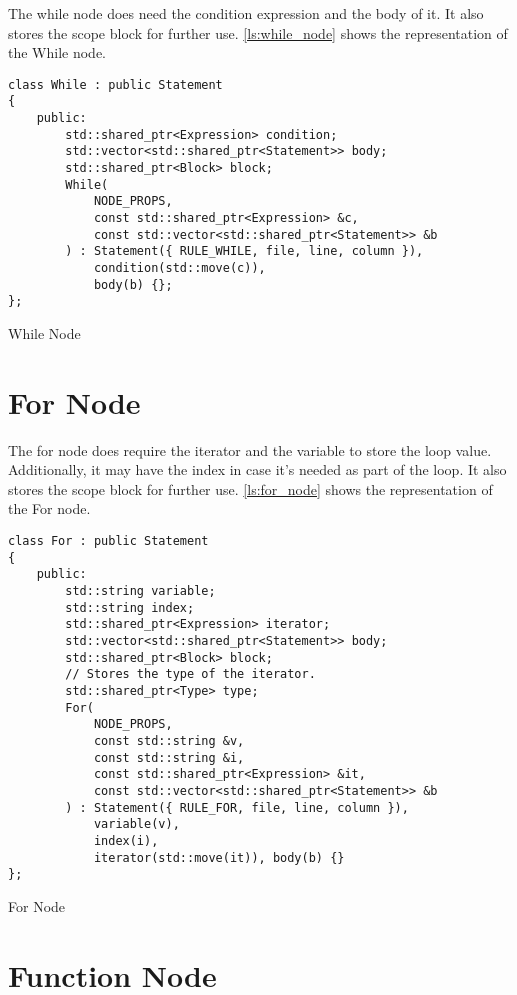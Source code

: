 The while node does need the condition expression and the body of it.
It also stores the scope block for further use.
\autoref{ls:while_node} shows the representation of the While node.

\begin{listing}[H]
\begin{verbatim}
class While : public Statement
{
    public:
        std::shared_ptr<Expression> condition;
        std::vector<std::shared_ptr<Statement>> body;
        std::shared_ptr<Block> block;
        While(
            NODE_PROPS,
            const std::shared_ptr<Expression> &c,
            const std::vector<std::shared_ptr<Statement>> &b
        ) : Statement({ RULE_WHILE, file, line, column }),
            condition(std::move(c)),
            body(b) {};
};
\end{verbatim}
\caption{While Node}
\label{ls:while_node}
\end{listing}

\section{For Node}

The for node does require the iterator and the variable to store the loop value.
Additionally, it may have the index in case it's needed as part of the loop.
It also stores the scope block for further use.
\autoref{ls:for_node} shows the representation of the For node.

\begin{listing}[H]
\begin{verbatim}
class For : public Statement
{
    public:
        std::string variable;
        std::string index;
        std::shared_ptr<Expression> iterator;
        std::vector<std::shared_ptr<Statement>> body;
        std::shared_ptr<Block> block;
        // Stores the type of the iterator.
        std::shared_ptr<Type> type;
        For(
            NODE_PROPS,
            const std::string &v,
            const std::string &i,
            const std::shared_ptr<Expression> &it,
            const std::vector<std::shared_ptr<Statement>> &b
        ) : Statement({ RULE_FOR, file, line, column }),
            variable(v),
            index(i),
            iterator(std::move(it)), body(b) {}
};
\end{verbatim}
\caption{For Node}
\label{ls:for_node}
\end{listing}

\section{Function Node}

